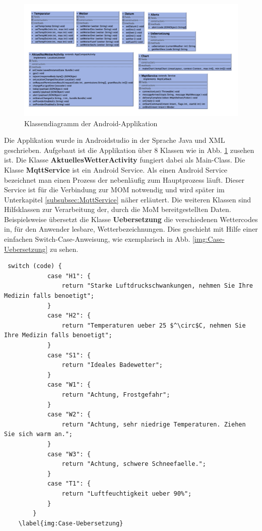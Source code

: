 \begin{figure}[htbp]
	\centering
	\includegraphics[width=1.0\textwidth]{Bilder/AndroidUML.png}
	\caption{Klassendiagramm der Android-Applikation}
	\label{img:AndroidUMLDiagramm}
\end{figure} 
Die Applikation wurde in Androidstudio in der Sprache Java und XML geschrieben. 
Aufgebaut ist die Applikation über 8 Klassen wie in  Abb. \ref{img:AndroidUMLDiagramm} zusehen ist. Die Klasse \textbf{AktuellesWetterActivity} fungiert dabei als Main-Class.
Die Klasse \textbf{MqttService} ist ein Android Service. Als einen Android Service bezeichnet man einen Prozess der nebenläufig zum Hauptprozess läuft. Dieser Service ist für die Verbindung zur MOM notwendig und wird später im Unterkapitel \ref{subsubsec:MqttService} näher erläutert.
Die weiteren Klassen sind Hilfsklassen zur Verarbeitung der, durch die MoM bereitgestellten Daten.
Beispielsweise übersetzt die Klasse \textbf{Uebersetzung} die verschiedenen Wettercodes in, für den Anwender lesbare, Wetterbezeichnungen. Dies geschieht mit Hilfe einer einfachen Switch-Case-Anweisung, wie exemplarisch in Abb. \ref{img:Case-Uebersetzung} zu sehen.
  \begin{lstlisting}
 switch (code) {
            case "H1": {
                return "Starke Luftdruckschwankungen, nehmen Sie Ihre Medizin falls benoetigt";
            }
            case "H2": {
                return "Temperaturen ueber 25 $^\circ$C, nehmen Sie Ihre Medizin falls benoetigt";
            }
            case "S1": {
                return "Ideales Badewetter";
            }
            case "W1": {
                return "Achtung, Frostgefahr";
            }
            case "W2": {
                return "Achtung, sehr niedrige Temperaturen. Ziehen Sie sich warm an.";
            }
            case "W3": {
                return "Achtung, schwere Schneefaelle.";
            }
            case "T1": {
                return "Luftfeuchtigkeit ueber 90%";
            }
        }
	\label{img:Case-Uebersetzung}
\end{lstlisting} 

